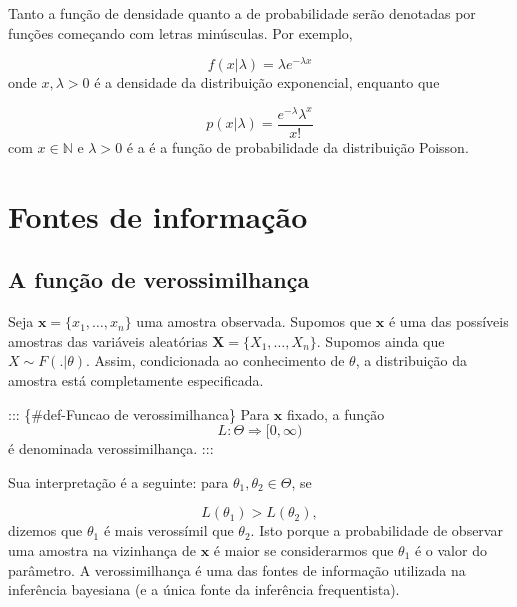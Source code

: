 \documentclass[
  letterpaper,
  DIV=11,
  numbers=noendperiod]{scrreprt}
\theoremstyle{definition}
\theoremstyle{definition}
\theoremstyle{remark}
\begin{document}
Tanto a função de densidade quanto a de probabilidade serão denotadas
por funções começando com letras minúsculas. Por exemplo,

\[f(x|\lambda)=\lambda e^{-\lambda x}\] onde \(x,\lambda>0\) é a
densidade da distribuição exponencial, enquanto que

\[p(x|\lambda)=\frac{e^{-\lambda}\lambda^x}{x!}\] com \(x\in\mathbb{N}\)
e \(\lambda >0\) é a é a função de probabilidade da distribuição
Poisson.

\hypertarget{fontes-de-informauxe7uxe3o}{%
\section{Fontes de informação}\label{fontes-de-informauxe7uxe3o}}

\hypertarget{a-funuxe7uxe3o-de-verossimilhanuxe7a}{%
\subsection{A função de
verossimilhança}\label{a-funuxe7uxe3o-de-verossimilhanuxe7a}}

Seja \(\mathbf{x} = \{x_1 , \ldots , x_n \}\) uma amostra observada.
Supomos que \(\mathbf{x}\) é uma das possíveis amostras das variáveis
aleatórias \(\mathbf{X} = \{X_1 , \ldots , X_n \}\). Supomos ainda que
\(X\sim F (.|\theta)\). Assim, condicionada ao conhecimento de
\(\theta\), a distribuição da amostra está completamente especificada.

::: \{\#def-Funcao de verossimilhanca\} Para \(\mathbf{x}\) fixado, a
função \[L:\Theta\Rightarrow [0,\infty)\] é denominada verossimilhança.
:::

Sua interpretação é a seguinte: para \(\theta_1,\theta_2\in\Theta\), se

\[L(\theta_1)>L(\theta_2),\] dizemos que \(\theta_1\) é mais verossímil
que \(\theta_2\). Isto porque a probabilidade de observar uma amostra na
vizinhança de \(\mathbf{x}\) é maior se considerarmos que \(\theta_1\) é
o valor do parâmetro. A verossimilhança é uma das fontes de informação
utilizada na inferência bayesiana (e a única fonte da inferência
frequentista).
\end{document}

